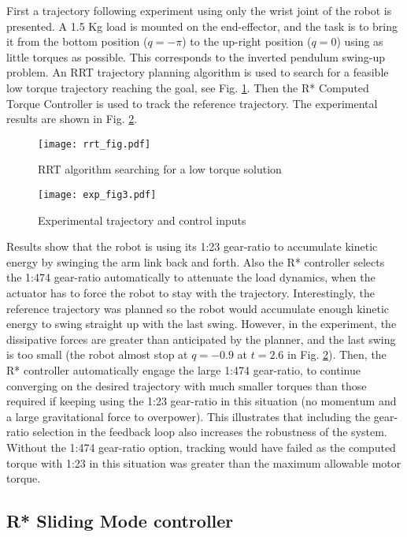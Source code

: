 First a trajectory following experiment using only the wrist joint of the robot is presented. A 1.5 Kg load is mounted on the end-effector, and the task is to bring it from the bottom position ($q=-\pi$) to the up-right position ($q=0$) using as little torques as possible. This corresponds to the inverted pendulum swing-up problem. An RRT trajectory planning algorithm is used to search for a feasible low torque trajectory reaching the goal, see Fig. \ref{fig:exp_rrt}. Then the R* Computed Torque Controller is used to track the reference trajectory. The experimental results are shown in Fig. \ref{fig:exp_traj}.
%
\begin{figure}[htp]
	\centering
		\texttt{[image: rrt\_fig.pdf]}
	\caption{RRT algorithm searching for a low torque solution}
	\label{fig:exp_rrt}
\end{figure}
%
\begin{figure}[htp]
	\centering
		\texttt{[image: exp\_fig3.pdf]}
	\caption{Experimental trajectory and control inputs}
	\label{fig:exp_traj}
	\vspace{-10pt}
\end{figure}
%
Results show that the robot is using its 1:23 gear-ratio to accumulate kinetic energy by swinging the arm link back and forth. Also the R* controller selects the 1:474 gear-ratio automatically to attenuate the load dynamics, when the actuator has to force the robot to stay with the trajectory.  Interestingly, the reference trajectory was planned so the robot would accumulate enough kinetic energy to swing straight up with the last swing. However, in the experiment, the dissipative forces are greater than anticipated by the planner, and the last swing is too small (the robot almost stop at $q=-0.9$ at $t=2.6$ in Fig. \ref{fig:exp_traj}). Then, the R* controller automatically engage the large 1:474 gear-ratio, to continue converging on the desired trajectory with much smaller torques than those required if keeping using the 1:23 gear-ratio in this situation (no momentum and a large gravitational force to overpower). This illustrates that including the gear-ratio selection in the feedback loop also increases the robustness of the system. Without the 1:474 gear-ratio option, tracking would have failed as the computed torque with 1:23 in this situation was greater than the maximum allowable motor torque.


\subsection{R* Sliding Mode controller}

